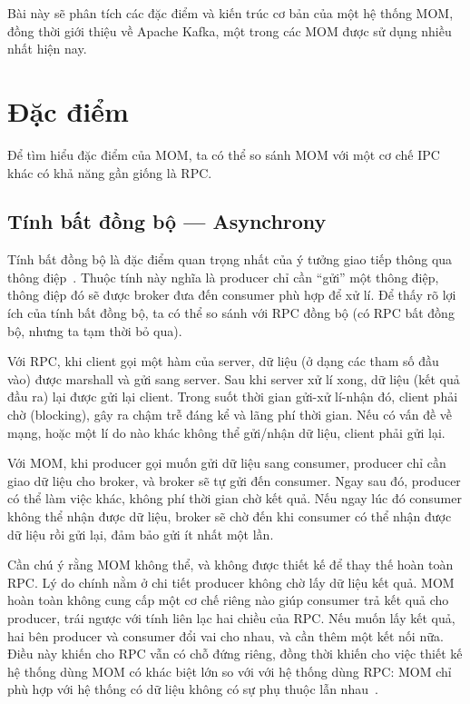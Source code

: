 \documentclass{article}
\begin{document}
Bài này sẽ phân tích các đặc điểm và kiến trúc cơ bản của một hệ thống MOM, đồng
thời giới thiệu về Apache Kafka, một trong các MOM được sử dụng nhiều nhất hiện
nay.

\section{Đặc điểm}

Để tìm hiểu đặc điểm của MOM, ta có thể so sánh MOM với một cơ chế IPC khác có
khả năng gần giống là RPC\@.

\subsection{Tính bất đồng bộ --- Asynchrony}

Tính bất đồng bộ là đặc điểm quan trọng nhất của ý tưởng giao tiếp thông qua
thông điệp~\cite{inbook}. Thuộc tính này nghĩa là producer chỉ cần ``gửi'' một
thông điệp, thông điệp đó sẽ được broker đưa đến consumer phù hợp để xử lí. Để
thấy rõ lợi ích của tính bất đồng bộ, ta có thể so sánh với RPC đồng bộ (có RPC
bất đồng bộ, nhưng ta tạm thời bỏ qua).

Với RPC, khi client gọi một hàm của server, dữ liệu (ở dạng các tham số đầu vào)
được marshall và gửi sang server. Sau khi server xử lí xong, dữ liệu (kết quả
đầu ra) lại được gửi lại client. Trong suốt thời gian gửi-xử lí-nhận đó, client
phải chờ (blocking), gây ra chậm trễ đáng kể và lãng phí thời gian. Nếu có vấn
đề về mạng, hoặc một lí do nào khác không thể gửi/nhận dữ liệu, client phải gửi
lại.

Với MOM, khi producer gọi muốn gửi dữ liệu sang consumer, producer chỉ cần giao
dữ liệu cho broker, và broker sẽ tự gửi đến consumer. Ngay sau đó, producer có
thể làm việc khác, không phí thời gian chờ kết quả. Nếu ngay lúc đó consumer
không thể nhận được dữ liệu, broker sẽ chờ đến khi consumer có thể nhận được dữ
liệu rồi gửi lại, đảm bảo gửi ít nhất một lần.

Cần chú ý rằng MOM không thể, và không được thiết kế để thay thế hoàn toàn
RPC\@. Lý do chính nằm ở chi tiết producer không chờ lấy dữ liệu kết quả. MOM
hoàn toàn không cung cấp một cơ chế riêng nào giúp consumer trả kết quả cho
producer, trái ngược với tính liên lạc hai chiều của RPC\@. Nếu muốn lấy kết
quả, hai bên producer và consumer đổi vai cho nhau, và cần thêm một kết nối nữa.
Điều này khiến cho RPC vẫn có chỗ đứng riêng, đồng thời khiến cho việc thiết kế
hệ thống dùng MOM có khác biệt lớn so với với hệ thống dùng RPC\@: MOM chỉ phù
hợp với hệ thống có dữ liệu không có sự phụ thuộc lẫn nhau~\cite{ejb3_c4}.
\end{document}
